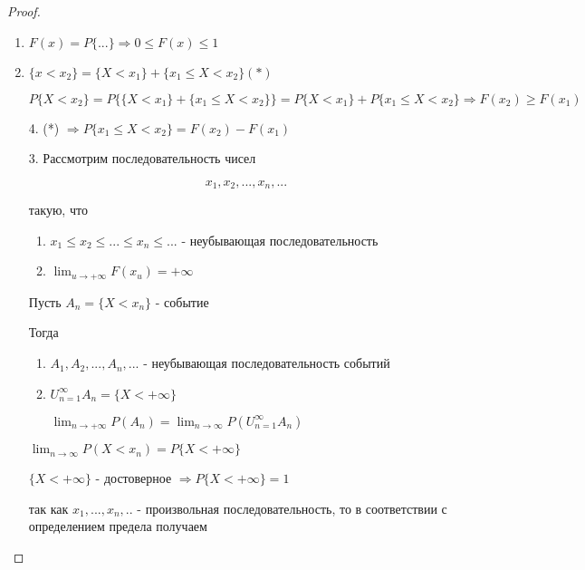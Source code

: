 \documentclass[a4paper, 14pt]{report}
\begin{document}
\begin{proof}

    \hfill

    \begin{enumerate}
        \item $F(x) = P\{...\} \Rightarrow 0 \le F(x) \le 1$

        \item $\{x < x_2\} = \{X < x_1\} + \{x_1 \le X < x_2\} (*)$

            $$
            P\{X < x_2\} = P \big\{ \{X<x_1\} + \{x_1 \le X < x_2 \} \big\} = P\{X < x_1\} + P\{x_1 \le X < x_2\} \Rightarrow F(x_2) \geq F(x_1)
            $$

        \item[4.] (*) $\Rightarrow P\{x_1 \le X < x_2\} = F(x_2) - F(x_1)$

        \item[3.] Рассмотрим последовательность чисел

            $$
            x_1, x_2, ..., x_n, ...
            $$

            такую, что

            \begin{enumerate}
                \item $x_1 \le x_2 \le ... \le x_n \le ...$ - неубывающая последовательность
                \item $\lim_{u \to + \infty} F(x_u) = + \infty$
            \end{enumerate}

            Пусть $A_n = \{ X < x_n \}$ - событие

            Тогда

            \begin{enumerate}
                \item $A_1, A_2, ..., A_n, ...$ - неубывающая последовательность событий
                \item $U_{n=1}^{\infty} A_n = \{ X < +\infty \}$

                    $\lim_{n \to + \infty} P(A_n) = \lim_{n \to \infty} P(U_{n=1}^\infty A_n)$ 
            \end{enumerate}
            
            $\lim_{n \to \infty} P(X < x_n) = P\{X < + \infty \}$

            $\{X < + \infty\}$ - достоверное $\Rightarrow P\{X<+\infty\} = 1$

            так как $x_1,...,x_n,..$ - произвольная последовательность, то в соответствии с
            определением предела получаем


\end{enumerate}
\end{proof}
\end{document}
